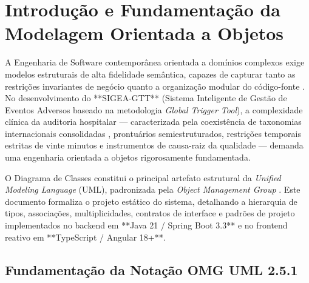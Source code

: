 \chapter{Introdução e Fundamentação da Modelagem Orientada a Objetos}
\label{cap_introducao_fundamentacao}

A Engenharia de Software contemporânea orientada a domínios complexos exige modelos estruturais de alta fidelidade semântica, capazes de capturar tanto as restrições invariantes de negócio quanto a organização modular do código-fonte \cite{booch2007, evans2003}. No desenvolvimento do **SIGEA-GTT** (Sistema Inteligente de Gestão de Eventos Adversos baseado na metodologia \textit{Global Trigger Tool}), a complexidade clínica da auditoria hospitalar --- caracterizada pela coexistência de taxonomias internacionais consolidadas \cite{ihi2009, nccmerp2001}, prontuários semiestruturados, restrições temporais estritas de vinte minutos e instrumentos de causa-raiz da qualidade --- demanda uma engenharia orientada a objetos rigorosamente fundamentada.

O Diagrama de Classes constitui o principal artefato estrutural da \textit{Unified Modeling Language} (UML), padronizada pela \textit{Object Management Group} \cite{omg2017}. Este documento formaliza o projeto estático do sistema, detalhando a hierarquia de tipos, associações, multiplicidades, contratos de interface e padrões de projeto implementados no backend em **Java 21 / Spring Boot 3.3** e no frontend reativo em **TypeScript / Angular 18+**.

\section{Fundamentação da Notação OMG UML 2.5.1}
\label{sec_fundamentacao_uml}

